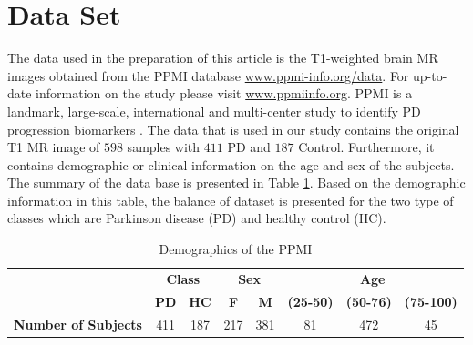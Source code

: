 \documentclass[runningheads,a4paper]{llncs}
\begin{document}
\section{Data Set}
The data used in the preparation of this article is the T1-weighted brain MR images obtained from the PPMI database \url{www.ppmi-info.org/data}. For up-to-date information on the study please visit \url{www.ppmiinfo.org}. PPMI is a landmark, large-scale, international and multi-center study to identify PD progression biomarkers \cite{15}. The data that is used in our study contains the original T1 MR image of $598$ samples with $411$ PD and $187$ Control. Furthermore, it contains demographic or clinical information on the age and sex of the subjects. The summary of the data base is presented in Table \ref{tab:ppmi}. Based on the demographic information in this table, the balance of dataset is presented for the two type of classes which are Parkinson disease (PD) and healthy control (HC).
\begin{table}[h]\small
  \centering
  \caption{Demographics of the PPMI}
  \begin{tabular}{|>{\bfseries}c|*{7}{c|}}\hline
    \multirow{2}{*}{\bfseries Data Type}
    & \multicolumn{2}{c|}{\bfseries Class}
    &\multicolumn{2}{c|}{\bfseries Sex}
    & \multicolumn{3}{c|}{\bfseries Age} \\\cline{2-8}
    & \textbf{PD} & \textbf{HC} & \textbf{F}&\textbf{M} & \textbf{(25-50)}&\textbf{(50-76)} &\textbf{(75-100)}\\ \hline
           Number of Subjects   &411 & 187 & 217 & 381 & 81&472&45      \\ \hline
  \end{tabular}
  \label{tab:ppmi}
\end{table}



\end{document}
